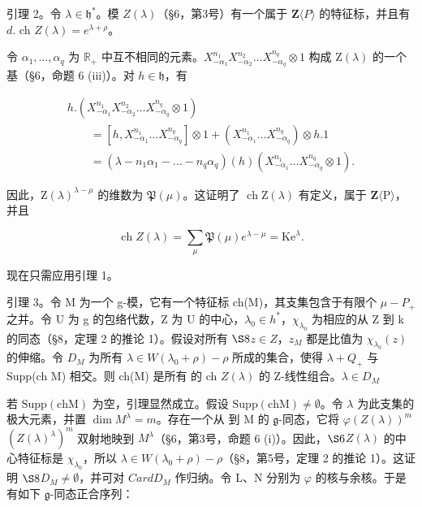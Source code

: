 引理 2。令 \(\lambda \in \mathfrak{h}^*\)。模 \(Z(\lambda)\)（§6，第3号）有一个属于 \(\mathbf{Z}\langle P\rangle\) 的特征标，并且有 \(d.\) ch \(Z(\lambda) = e^{\lambda + \rho}\)。

令 \(\alpha_{1},\ldots ,\alpha_{q}\) 为 \(\mathbb{R}_+\) 中互不相同的元素。\(X_{-\alpha_1}^{n_1}X_{-\alpha_2}^{n_2}\dots X_{-\alpha_q}^{n_q}\otimes 1\) 构成 \(\mathrm{Z}(\lambda)\) 的一个基（§6，命题 6 (iii)）。对 \(h\in \mathfrak{h}\)，有

\[
\begin{array}{l} h. (X _ {- \alpha_ {1}} ^ {n _ {1}} X _ {- \alpha_ {2}} ^ {n _ {2}} \ldots X _ {- \alpha_ {q}} ^ {n _ {q}} \otimes 1) \\ \qquad = [ h, X _ {- \alpha_ {1}} ^ {n _ {1}} \ldots X _ {- \alpha_ {q}} ^ {n _ {q}} ] \otimes 1 + (X _ {- \alpha_ {1}} ^ {n _ {1}} \ldots X _ {- \alpha_ {q}} ^ {n _ {q}}) \otimes h. 1 \\ \qquad = (\lambda - n _ {1} \alpha_ {1} - \dots - n _ {q} \alpha_ {q}) (h) (X _ {- \alpha_ {1}} ^ {n _ {1}} \ldots X _ {- \alpha_ {q}} ^ {n _ {q}} \otimes 1). \end{array}
\]

因此，\(\mathrm{Z}(\lambda)^{\lambda - \mu}\) 的维数为 \(\mathfrak{P}(\mu)\)。这证明了 \(\operatorname{ch} \mathrm{Z}(\lambda)\) 有定义，属于 \(\mathbf{Z}\langle \mathrm{P} \rangle\)，并且

\[
\operatorname{ch} Z (\lambda) = \sum_ {\mu} \mathfrak {P} (\mu) e ^ {\lambda - \mu} = \mathrm{Ke} ^ {\lambda}.
\]

现在只需应用引理 1。

引理 3。令 M 为一个 g-模，它有一个特征标 ch(M)，其支集包含于有限个 \(\mu-P_{+}\) 之并。令 U 为 g 的包络代数，Z 为 U 的中心，\(\lambda_{0}\in h^{*}\)，\(\chi_{\lambda_{0}}\) 为相应的从 Z 到 k 的同态（§8，定理 2 的推论 1）。假设对所有 \(\S8\)\(z\in Z\)，\(z_{M}\) 都是比值为 \(\chi_{\lambda_{0}}(z)\) 的伸缩。令 \(D_{M}\) 为所有 \(\lambda\in W(\lambda_{0}+\rho)-\rho\) 所成的集合，使得 \(\lambda+Q_{+}\) 与 Supp(ch M) 相交。则 ch(M) 是所有  的 ch \(Z(\lambda)\) 的 Z-线性组合。\(\lambda\in D_{M}\)

若 \(\mathrm{Supp(chM)}\) 为空，引理显然成立。假设 \(\mathrm{Supp(chM)} \neq \emptyset\)。令 \(\lambda\) 为此支集的极大元素，并置 \(\dim M^{\lambda} = m\)。存在一个从  到 M 的 \(\mathfrak{g}\)-同态，它将 \(\varphi\)\((Z(\lambda))^{m}\)\((Z(\lambda)^{\lambda})^{m}\) 双射地映到 \(M^{\lambda}\)（§6，第3号，命题 6 (i)）。因此，\(\S 6\)\(Z(\lambda)\) 的中心特征标是 \(\chi_{\lambda_0}\)，所以 \(\lambda \in W(\lambda_0 + \rho) - \rho\)（§8，第5号，定理 2 的推论 1）。这证明 \(\S 8\)\(D_M \neq \emptyset\)，并可对 \(CardD_M\) 作归纳。令 L、N 分别为 \(\varphi\) 的核与余核。于是有如下 \(\mathfrak{g}\)-同态正合序列：

